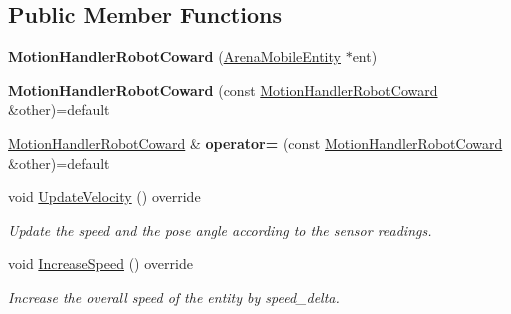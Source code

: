 \subsection*{Public Member Functions}
\begin{DoxyCompactItemize}
\item 
\mbox{\label{class_motion_handler_robot_coward_a51242788c5a3ca3dc46530a14ab8e301}} 
{\bfseries Motion\+Handler\+Robot\+Coward} (\mbox{\hyperlink{class_arena_mobile_entity}{Arena\+Mobile\+Entity}} $\ast$ent)
\item 
\mbox{\label{class_motion_handler_robot_coward_ae650416cd316871701127a288eed709a}} 
{\bfseries Motion\+Handler\+Robot\+Coward} (const \mbox{\hyperlink{class_motion_handler_robot_coward}{Motion\+Handler\+Robot\+Coward}} \&other)=default
\item 
\mbox{\label{class_motion_handler_robot_coward_a3bcc3dd802154daf29fa2740bd6c31ae}} 
\mbox{\hyperlink{class_motion_handler_robot_coward}{Motion\+Handler\+Robot\+Coward}} \& {\bfseries operator=} (const \mbox{\hyperlink{class_motion_handler_robot_coward}{Motion\+Handler\+Robot\+Coward}} \&other)=default
\item 
\mbox{\label{class_motion_handler_robot_coward_a5f4f03d6128a7d19b2c36af433a17cfd}} 
void \mbox{\hyperlink{class_motion_handler_robot_coward_a5f4f03d6128a7d19b2c36af433a17cfd}{Update\+Velocity}} () override
\begin{DoxyCompactList}\small\item\em Update the speed and the pose angle according to the sensor readings. \end{DoxyCompactList}\item 
\mbox{\label{class_motion_handler_robot_coward_a22416ce3267987817dc3aba02bfb5d7b}} 
void \mbox{\hyperlink{class_motion_handler_robot_coward_a22416ce3267987817dc3aba02bfb5d7b}{Increase\+Speed}} () override
\begin{DoxyCompactList}\small\item\em Increase the overall speed of the entity by speed\+\_\+delta. \end{DoxyCompactList}\item 
\mbox{\label{class_motion_handler_robot_coward_ad8280dc0f2bcdaf93b68ae87447cdef4}} 

\end{DoxyCompactItemize}

